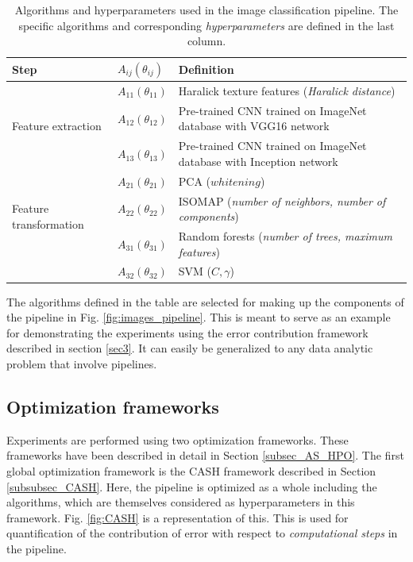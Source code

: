 \begin{table}[ht!]
\centering
\caption{Algorithms and hyperparameters used in the image classification pipeline. The specific algorithms and corresponding \textit{hyperparameters} are defined in the last column.}
\begin{tabular}{@{} |m{9.7em}|m{1.5cm}|m{8cm}| @{}} 
 \hline
 Step & $A_{ij}(\theta_{ij})$ & Definition \\ 
 \hline
 \multirow{3}{*}{Feature extraction} & $A_{11}(\theta_{11})$ & Haralick texture features (\textit{Haralick distance}) \\ 
 & $A_{12}(\theta_{12})$ & Pre-trained CNN trained on ImageNet \cite{deng2009imagenet} database with VGG16 \cite{simonyan2014very} network  \\
  & $A_{13}(\theta_{13})$ & Pre-trained CNN trained on ImageNet \cite{deng2009imagenet} database with Inception \cite{szegedy2016rethinking} network  \\
 \hline
 \multirow{3}{*}{Feature transformation} & $A_{21}(\theta_{21})$ & PCA ($whitening$) \cite{wold1987principal} \\
 & $A_{22}(\theta_{22})$ & ISOMAP (\textit{number of neighbors, number of components}) \cite{tenenbaum2000global} \\
 \hline
 \multirow{3}{*}{Learning algorithms} & $A_{31}(\theta_{31})$ & Random forests (\textit{number of trees, maximum features}) \cite{breiman2001random} \\
 & $A_{32}(\theta_{32})$ & SVM ($C, \gamma$) \cite{cortes1995support}\\
 \hline
 \end{tabular}
 \label{table:algorithms_table}
\end{table}
The algorithms defined in the table are selected for making up the components of the pipeline in Fig. \ref{fig:images_pipeline}. This is meant to serve as an example for demonstrating the experiments using the error contribution framework described in section \ref{sec3}. It can easily be generalized to any data analytic problem that involve pipelines. 

\subsection{Optimization frameworks}
\label{frameworks}
Experiments are performed using two optimization frameworks. These frameworks have been described in detail in Section \ref{subsec_AS_HPO}. 
The first global optimization framework is the CASH framework described in Section \ref{subsubsec_CASH}. Here, the pipeline is optimized as a whole including the algorithms, which are themselves considered as hyperparameters in this framework.  Fig. \ref{fig:CASH} is a representation of this. This is used for quantification of the contribution of error with respect to \textit{computational steps} in the pipeline.

